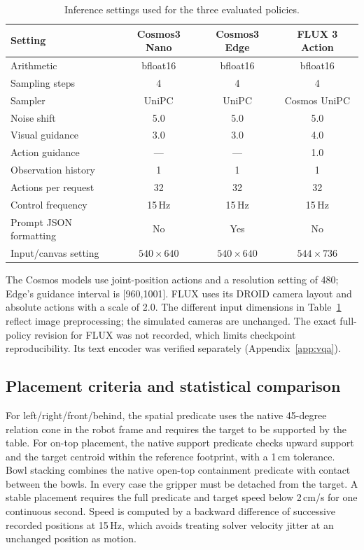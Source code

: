 \documentclass{article}
\begin{document}
\begin{table}[htbp]
\centering\small
\caption{Inference settings used for the three evaluated policies.}
\label{tab:appendix-settings}
\begin{tabular}{@{}lccc@{}}
\toprule Setting & Cosmos3 Nano & Cosmos3 Edge & FLUX 3 Action\\
\midrule
Arithmetic & bfloat16 & bfloat16 & bfloat16\\
Sampling steps & 4 & 4 & 4\\
Sampler & UniPC & UniPC & Cosmos UniPC\\
Noise shift & 5.0 & 5.0 & 5.0\\
Visual guidance & 3.0 & 3.0 & 4.0\\
Action guidance & --- & --- & 1.0\\
Observation history & 1 & 1 & 1\\
Actions per request & 32 & 32 & 32\\
Control frequency & 15\,Hz & 15\,Hz & 15\,Hz\\
Prompt JSON formatting & No & Yes & No\\
Input/canvas setting & $540\!\times\!640$ & $540\!\times\!640$ & $544\!\times\!736$\\
\bottomrule
\end{tabular}
\end{table}

The Cosmos models use joint-position actions and a resolution setting of 480; Edge's guidance interval is [960,1001]. FLUX uses its DROID camera layout and absolute actions with a scale of 2.0. The different input dimensions in Table~\ref{tab:appendix-settings} reflect image preprocessing; the simulated cameras are unchanged. The exact full-policy revision for FLUX was not recorded, which limits checkpoint reproducibility. Its text encoder was verified separately (Appendix~\ref{app:vqa}).

\subsection{Placement criteria and statistical comparison}\label{app:statistics}
For left/right/front/behind, the spatial predicate uses the native 45-degree relation cone in the robot frame and requires the target to be supported by the table. For on-top placement, the native support predicate checks upward support and the target centroid within the reference footprint, with a 1\,cm tolerance. Bowl stacking combines the native open-top containment predicate with contact between the bowls. In every case the gripper must be detached from the target. A stable placement requires the full predicate and target speed below 2\,cm/s for one continuous second. Speed is computed by a backward difference of successive recorded positions at 15\,Hz, which avoids treating solver velocity jitter at an unchanged position as motion.
\end{document}
